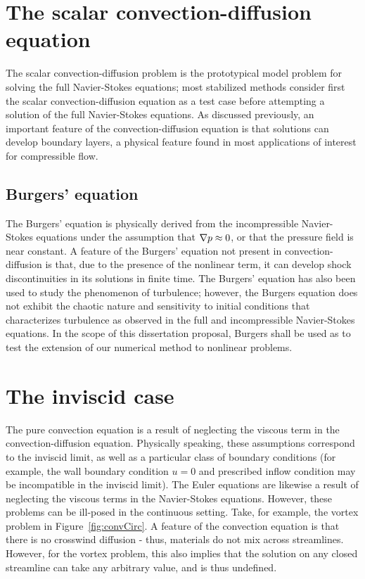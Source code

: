 \section{The scalar convection-diffusion equation}

The scalar convection-diffusion problem is the prototypical model problem for solving the full Navier-Stokes equations; most stabilized methods consider first the scalar convection-diffusion equation as a test case before attempting a solution of the full Navier-Stokes equations. As discussed previously, an important feature of the convection-diffusion equation is that solutions can develop  boundary layers, a physical feature found in most applications of interest for compressible flow. 


\subsection{Burgers' equation}

The Burgers' equation is physically derived from the incompressible Navier-Stokes equations under the assumption that $\grad p \approx 0$, or that the pressure field is near constant. A feature of the Burgers' equation not present in convection-diffusion is that, due to the presence of the nonlinear term, it can develop shock discontinuities in its solutions in finite time.  The Burgers' equation has also been used to study the phenomenon of turbulence; however, the Burgers equation does not exhibit the chaotic nature and sensitivity to initial conditions that characterizes turbulence as observed in the full and incompressible Navier-Stokes equations. In the scope of this dissertation proposal, Burgers shall be used as to test the extension of our numerical method to nonlinear problems. 

\section{The inviscid case}

The pure convection equation is a result of neglecting the viscous term in the convection-diffusion equation. Physically speaking, these assumptions correspond to the inviscid limit, as well as a particular class of boundary conditions (for example, the wall boundary condition $u = 0$ and prescribed inflow condition may be incompatible in the inviscid limit).  The Euler equations are likewise a result of neglecting the viscous terms in the Navier-Stokes equations.  However, these problems can be ill-posed in the continuous setting.  Take, for example, the vortex problem in Figure~\ref{fig:convCirc}.  A feature of the convection equation is that there is no crosswind diffusion - thus, materials do not mix across streamlines.  However, for the vortex problem, this also implies that the solution on any closed streamline can take any arbitrary value, and is thus undefined.  

